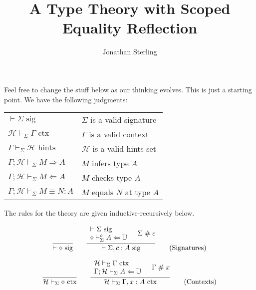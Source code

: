 \documentclass{amsart}
\title{A Type Theory with Scoped Equality Reflection}
\author{Jonathan Sterling}
\begin{document}
\maketitle

\def\emp{\diamond}
\def\sig{\mbox{ sig}}
\def\ctx{\mbox{ ctx}}
\def\hints{\mbox{ hints}}
\def\fresh{\mathrel{\#}}
\def\infers{\Rightarrow}
\def\checks{\Leftarrow}
\def\uni{\mathbb{U}}

Feel free to change the stuff below as our thinking evolves. This is just a
starting point. We have the following judgments:

\bigskip
\begin{tabular}{ll}
$\vdash\Sigma\sig$                            & $\Sigma$ is a valid signature\\
$\mathcal{H}\vdash_\Sigma\Gamma\ctx$          & $\Gamma$ is a valid context\\
$\Gamma\vdash_\Sigma\mathcal{H}\hints$        & $\mathcal{H}$ is a valid hints set\\
$\Gamma;\mathcal{H}\vdash_\Sigma M\infers A$ & $M$ infers type $A$\\
$\Gamma;\mathcal{H}\vdash_\Sigma M\checks A$  & $M$ checks type $A$\\
$\Gamma;\mathcal{H}\vdash_\Sigma M\equiv N:A$ & $M$ equals $N$ at type $A$
\end{tabular}
\bigskip

\noindent
The rules for the theory are given inductive-recursively below.

\begin{equation}
  \infer{\vdash\emp\sig}{}
  \qquad
  \infer{
    \vdash\Sigma,c:A\sig
  }{
    \begin{array}{l}
      \vdash\Sigma\sig\\
      \emp\vdash_\Sigma^\emp A\checks\uni
    \end{array} &
    \Sigma\fresh c
  }
  \tag{Signatures}
\end{equation}

\begin{equation}
  \infer{\mathcal{H}\vdash_\Sigma\emp\ctx}{}
  \qquad
  \infer{
    \mathcal{H}\vdash_\Sigma\Gamma,x:A\ctx
  }{
    \begin{array}{l}
      \mathcal{H}\vdash_\Sigma\Gamma\ctx\\
      \Gamma;\mathcal{H}\vdash_\Sigma A\checks\uni\\
    \end{array} &
    \Gamma\fresh x
  }
  \tag{Contexts}
\end{equation}
\end{document}
